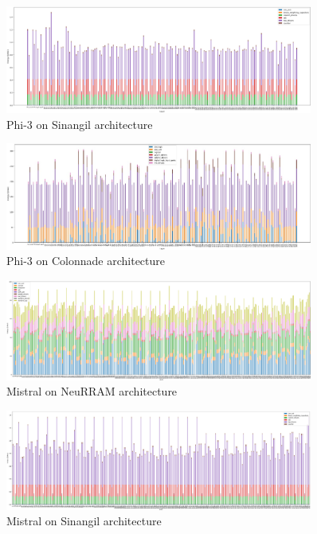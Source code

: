 \documentclass[conference]{IEEEtran}
\begin{document}
\begin{center}
\begin{figure}[ht]
    \centering
    \includegraphics[width=0.9\textwidth]{images/phi3_sinangil.png}
    \caption{Phi-3 on Sinangil architecture}
    \label{fig:phi3_sinangil}
\end{figure}

\begin{figure}[ht]
    \centering
    \includegraphics[width=0.9\textwidth]{images/phi3_colonnade_arch.jpg}
    \caption{Phi-3 on Colonnade architecture}
    \label{fig:phi3_colonnade}
\end{figure}

\begin{figure}[ht]
    \centering
    \includegraphics[width=0.9\textwidth]{images/mistral_wan_arch.png}
    \caption{Mistral on NeuRRAM architecture}
    \label{fig:mistral_NeuRRAM}
\end{figure}

\begin{figure}[ht]
    \centering
    \includegraphics[width=0.9\textwidth]{images/mistral_sinangil_arch.png}
    \caption{Mistral on Sinangil architecture}
    \label{fig:mistral_Sinangil}
\end{figure}


\end{center}
\end{document}
